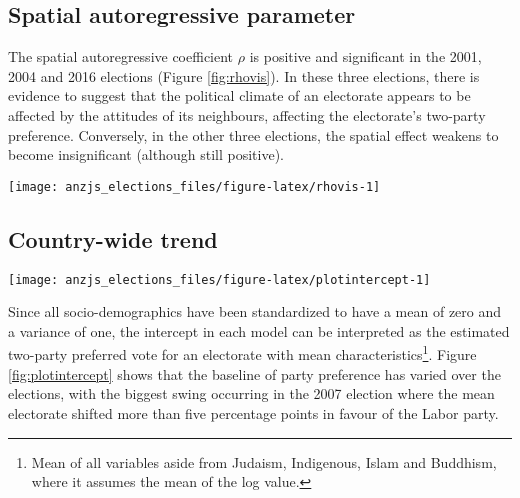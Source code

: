 \documentclass[times, doublespace]{anzsauth}
\let\rmarkdownfootnote\footnote%
\def\footnote{\protect\rmarkdownfootnote}
\let\origfigure\figure
\let\endorigfigure\endfigure
\renewenvironment{figure}[1][2] {
    \expandafter\origfigure\expandafter[htbp]
} {
    \endorigfigure
}
\begin{document}
\hypertarget{spatial-autoregressive-parameter}{%
\subsection{Spatial autoregressive parameter}\label{spatial-autoregressive-parameter}}

The spatial autoregressive coefficient \(\rho\) is positive and significant in the 2001, 2004 and 2016 elections (Figure \ref{fig:rhovis}). In these three elections, there is evidence to suggest that the political climate of an electorate appears to be affected by the attitudes of its neighbours, affecting the electorate's two-party preference. Conversely, in the other three elections, the spatial effect weakens to become insignificant (although still positive).

\begin{figure}[h]

{\centering \texttt{[image: anzjs\_elections\_files/figure-latex/rhovis-1]} 

}

\caption{Estimates of the spatial autoregressive parameter for each of the six elections, reported with their individual 95\% confidence intervals. Only in 2001 and 2016 is there a significant spatial component.}\label{fig:rhovis}
\end{figure}

\hypertarget{country-wide-trend}{%
\subsection{Country-wide trend}\label{country-wide-trend}}

\begin{figure}[h]

{\centering \texttt{[image: anzjs\_elections\_files/figure-latex/plotintercept-1]} 

}

\caption{Estimated intercept for each election, which represents the two-party preferred vote for an electorate with mean characteristics.}\label{fig:plotintercept}
\end{figure}

Since all socio-demographics have been standardized to have a mean of zero and a variance of one, the intercept in each model can be interpreted as the estimated two-party preferred vote for an electorate with mean characteristics\footnote{Mean of all variables aside from Judaism, Indigenous, Islam and Buddhism, where it assumes the mean of the log value.}. Figure \ref{fig:plotintercept} shows that the baseline of party preference has varied over the elections, with the biggest swing occurring in the 2007 election where the mean electorate shifted more than five percentage points in favour of the Labor party.
\end{document}
